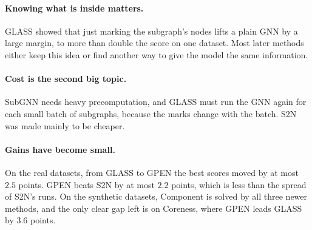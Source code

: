 \documentclass[11pt]{article}
\begin{document}
\paragraph{Knowing what is inside matters.} GLASS showed that just marking the subgraph's
nodes lifts a plain GNN by a large margin, to more than double the score on one dataset. Most later
methods either keep this idea or find another way to give the model the same information.

\paragraph{Cost is the second big topic.} SubGNN needs heavy precomputation, and GLASS must
run the GNN again for each small batch of subgraphs, because the marks change with the batch.
S2N was made mainly to be cheaper.

\paragraph{Gains have become small.} On the real datasets, from GLASS to GPEN the best scores
moved by at most $2.5$ points. GPEN beats S2N by at most $2.2$ points, which is less than the
spread of S2N's runs. On the synthetic datasets, Component is solved by all three newer
methods, and the only clear gap left is on Coreness, where GPEN leads GLASS by $3.6$ points.
\end{document}
